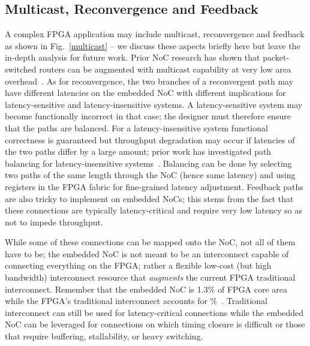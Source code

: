 %
%

%
\subsection{Multicast, Reconvergence and Feedback}
%

%
%

A complex FPGA application may include multicast, reconvergence and feedback as shown in Fig.~\ref{multicast} -- we discuss these aspects briefly here but leave the in-depth analysis for future work.
Prior NoC research has shown that packet-switched routers can be augmented with multicast capability at very low area overhead~\cite{Enright2008}.
As for reconvergence, the two branches of a reconvergent path may have different latencies on the embedded NoC with different implications for latency-sensitive and latency-insensitive systems.
A latency-sensitive system may become functionally incorrect in that case; the designer must therefore ensure that the paths are balanced.
For a latency-insensitive system functional correctness is guaranteed but throughput degradation may occur if latencies of the two paths differ by a large amount; prior work has investigated path balancing for latency-insensitive systems~\cite{Lu2003}.
Balancing can be done by selecting two paths of the same length through the NoC (hence same latency) and using registers in the FPGA fabric for fine-grained latency adjustment.
Feedback paths are also tricky to implement on embedded NoCs; this stems from the fact that these connections are typically latency-critical and require very low latency so as not to impede throughput.

While some of these connections can be mapped onto the NoC, not all of them have to be; the embedded NoC is not meant to be an interconnect capable of connecting everything on the FPGA; rather a flexible low-cost (but high bandwidth) interconnect resource that \textit{augments} the current FPGA traditional interconnect. 
Remember that the embedded NoC is 1.3\% of FPGA core area while the FPGA's traditional interconnect accounts for \%~\cite{Lewis2013}.
Traditional interconnect can still be used for latency-critical connections while the embedded NoC can be leveraged for connections on which timing closure is difficult or those that require buffering, stallability, or heavy switching.



%
%
